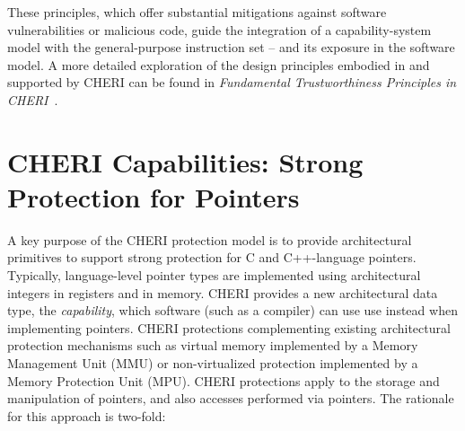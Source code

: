 \noindent
These principles, which offer 
substantial mitigations against
 software vulnerabilities or malicious code, guide the integration
of a capability-system model with the general-purpose instruction set -- and
its exposure in the software model.
A more detailed exploration of the design principles embodied in and supported
by CHERI can be found in \textit{Fundamental Trustworthiness Principles in
CHERI}~\cite{neumann2017:cheri-principles}.

\section{CHERI Capabilities: Strong Protection for Pointers}

A key purpose of the CHERI protection model is to provide architectural
primitives to support strong protection for C and C++-language pointers.
Typically, language-level pointer types are implemented using architectural
integers in registers and in memory.
CHERI provides a new architectural data type, the \textit{capability}, which
software (such as a compiler) can use use instead when implementing pointers.
CHERI protections complementing existing architectural protection mechanisms
such as virtual memory implemented by a Memory Management Unit (MMU) or
non-virtualized protection implemented by a Memory Protection Unit (MPU).
CHERI protections apply to the storage and manipulation of pointers, and also
accesses performed via pointers.
The rationale for this approach is two-fold:

